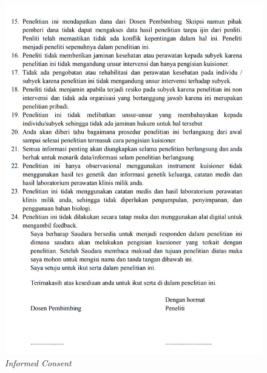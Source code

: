 \begin{figure}[H]
	\centering
	\includegraphics[width=\textwidth]{contents/appendix/Inform2.png}
	\caption{\textit{Informed Consent}}
	\label{Fig:Informed Concent2}
\end{figure}